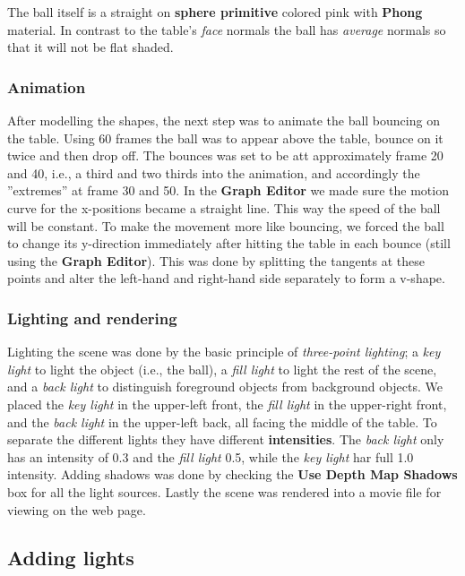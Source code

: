 \documentclass[a4paper]{article}
\begin{document}
The ball itself is a straight on \textbf{sphere primitive} colored pink with \textbf{Phong} material. In contrast to the table's \textit{face} normals the ball has \textit{average} normals so that it will not be flat shaded. 

\subsubsection{Animation}
After modelling the shapes, the next step was to animate the ball bouncing on the table. Using 60 frames the ball was to appear above the table, bounce on it twice and then drop off. The bounces was set to be att approximately frame 20 and 40, i.e., a third and two thirds into the animation, and accordingly the ''extremes'' at frame 30 and 50. In the \textbf{Graph Editor} we made sure the motion curve for the x-positions became a straight line. This way the speed of the ball will be constant. To make the movement more like bouncing, we forced the ball to change its y-direction immediately after hitting the table in each bounce (still using the \textbf{Graph Editor}). This was done by splitting the tangents at these points and alter the left-hand and right-hand side separately to form a v-shape. 

\subsubsection{Lighting and rendering}
Lighting the scene was done by the basic principle of \textit{three-point lighting}; a \textit{key light} to light the object (i.e., the ball), a \textit{fill light} to light the rest of the scene, and a \textit{back light} to distinguish foreground objects from background objects. We placed the \textit{key light} in the upper-left front, the \textit{fill light} in the upper-right front, and the \textit{back light} in the upper-left back, all facing the middle of the table. To separate the different lights they have different \textbf{intensities}. The \textit{back light} only has an intensity of 0.3 and the \textit{fill light} 0.5, while the \textit{key light} har full 1.0 intensity. Adding shadows was done by checking the \textbf{Use Depth Map Shadows} box for all the light sources. Lastly the scene was rendered into a movie file for viewing on the web page.

\subsection{Adding lights} %
\newpage
\end{document}
